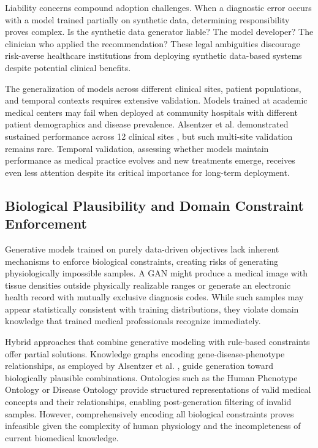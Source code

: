 Liability concerns compound adoption challenges. When a diagnostic error occurs with a model trained partially on synthetic data, determining responsibility proves complex. Is the synthetic data generator liable? The model developer? The clinician who applied the recommendation? These legal ambiguities discourage risk-averse healthcare institutions from deploying synthetic data-based systems despite potential clinical benefits.

The generalization of models across different clinical sites, patient populations, and temporal contexts requires extensive validation. Models trained at academic medical centers may fail when deployed at community hospitals with different patient demographics and disease prevalence. Alsentzer et al. demonstrated sustained performance across 12 clinical sites \cite{alsentzer2025few}, but such multi-site validation remains rare. Temporal validation, assessing whether models maintain performance as medical practice evolves and new treatments emerge, receives even less attention despite its critical importance for long-term deployment.

\subsection{Biological Plausibility and Domain Constraint Enforcement}

Generative models trained on purely data-driven objectives lack inherent mechanisms to enforce biological constraints, creating risks of generating physiologically impossible samples. A GAN might produce a medical image with tissue densities outside physically realizable ranges or generate an electronic health record with mutually exclusive diagnosis codes. While such samples may appear statistically consistent with training distributions, they violate domain knowledge that trained medical professionals recognize immediately.

Hybrid approaches that combine generative modeling with rule-based constraints offer partial solutions. Knowledge graphs encoding gene-disease-phenotype relationships, as employed by Alsentzer et al. \cite{alsentzer2025few}, guide generation toward biologically plausible combinations. Ontologies such as the Human Phenotype Ontology or Disease Ontology provide structured representations of valid medical concepts and their relationships, enabling post-generation filtering of invalid samples. However, comprehensively encoding all biological constraints proves infeasible given the complexity of human physiology and the incompleteness of current biomedical knowledge.

